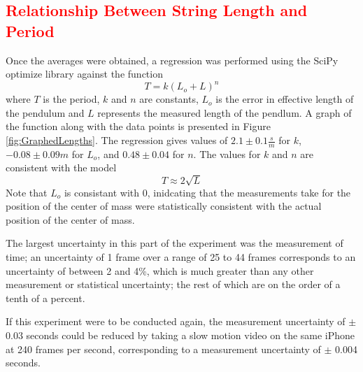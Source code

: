 \documentclass[11pt]{article}
\begin{document}
        \subsection{\textcolor{red}{Relationship Between String Length and Period}} \label{sec:StringVsPeriod}
        {
        Once the averages were obtained, a regression was performed using the SciPy optimize library \cite{2020SciPy-NMeth} against the function
            \begin{equation}
                T = k(L_o + L)^n
            \end{equation}
        where $T$ is the period, $k$ and $n$ are constants, $L_o$ is the error in effective length of the pendulum and $L$ represents the measured length of the pendlum. A graph of the function along with the data points is presented in Figure \ref{fig:GraphedLengths}. The regression gives values of $2.1 \pm 0.1 \frac{s}{m}$ for $k$, $-0.08 \pm 0.09 m$ for $L_o$, and $0.48 \pm 0.04$ for $n$. The values for $k$ and $n$ are consistent with the model
            \begin{equation}
                T \approx 2\sqrt{L}
            \end{equation} 
        Note that $L_o$ is consistant with 0, inidcating that the measurements take for the position of the center of mass were statistically consistent with the actual position of the center of mass. 
        
        The largest uncertainty in this part of the experiment was the measurement of time; an uncertainty of 1 frame over a range of 25 to 44 frames corresponds to an uncertainty of between 2 and 4\%, which is much greater than any other measurement or statistical uncertainty; the rest of which are on the order of a tenth of a percent.

        If this experiment were to be conducted again, the measurement uncertainty of $\pm$ 0.03 seconds could be reduced by taking a slow motion video on the same iPhone at 240 frames per second, corresponding to a measurement uncertainty of $\pm$ 0.004 seconds.
        }
\end{document}
